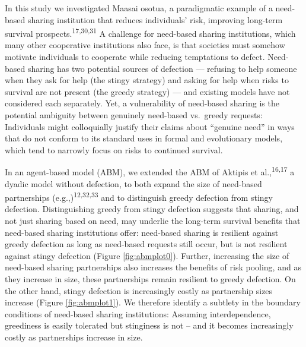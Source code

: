 \documentclass[
]{article}
\begin{document}
In this study we investigated Maasai osotua, a paradigmatic example of a need-based sharing institution that reduces individuals' risk, improving long-term survival prospects.\textsuperscript{17,30,31} A challenge for need-based sharing institutions, which many other cooperative institutions also face, is that societies must somehow motivate individuals to cooperate while reducing temptations to defect. Need-based sharing has two potential sources of defection --- refusing to help someone when they ask for help (the stingy strategy) and asking for help when risks to survival are not present (the greedy strategy) --- and existing models have not considered each separately. Yet, a vulnerability of need-based sharing is the potential ambiguity between genuinely need-based vs.~greedy requests: Individuals might colloquially justify their claims about ``genuine need'' in ways that do not conform to its standard uses in formal and evolutionary models, which tend to narrowly focus on risks to continued survival.

In an agent-based model (ABM), we extended the ABM of Aktipis et al.,\textsuperscript{16,17} a dyadic model without defection, to both expand the size of need-based partnerships (e.g.,)\textsuperscript{12,32,33} and to distinguish greedy defection from stingy defection. Distinguishing greedy from stingy defection suggests that sharing, and not just sharing based on need, may underlie the long-term survival benefits that need-based sharing institutions offer: need-based sharing is resilient against greedy defection as long as need-based requests still occur, but is not resilient against stingy defection (Figure \ref{fig:abmplot0}). Further, increasing the size of need-based sharing partnerships also increases the benefits of risk pooling, and as they increase in size, these partnerships remain resilient to greedy defection. On the other hand, stingy defection is increasingly costly as partnership sizes increase (Figure \ref{fig:abmplot1}). We therefore identify a subtlety in the boundary conditions of need-based sharing institutions: Assuming interdependence, greediness is easily tolerated but stinginess is not -- and it becomes increasingly costly as partnerships increase in size.
\end{document}
